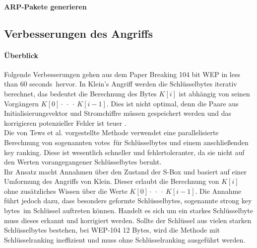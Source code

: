 \documentclass[10pt,a4paper]{article}
\begin{document}
\paragraph{ARP-Pakete generieren}

\subsection{Verbesserungen des Angriffs}
\paragraph{Überblick}
Folgende Verbesserungen gehen aus dem Paper \glqq Breaking 104 bit WEP in less than 60 seconds\grqq \cite{TWP07}\ hervor.
In Klein's Angriff werden die Schlüsselbytes iterativ berechnet, das bedeutet die Berechnung des Bytes $K[i]$ ist abhängig von seinen Vorgängern $K[0] \cdot\ \cdot\ \cdot\ K[i-1]$. Dies ist nicht optimal, denn die Paare aus Initialisierungsvektor und Stromchiffre müssen gespeichert werden und das korrigieren potenzieller Fehler ist teuer \cite[Kapitel 4]{TWP07}.\\ Die von Tews et al. vorgestellte Methode verwendet eine parallelisierte Berechnung von sogenannten \glqq votes\grqq\ für Schlüsselbytes und einem anschließenden \glqq key ranking\grqq. Diese ist wesentlich schneller und fehlertoleranter, da sie nicht auf den Werten vorangegangener Schlüsselbytes beruht.\\Ihr Ansatz macht Annahmen über den Zustand der S-Box und basiert auf einer Umformung des Angriffs von Klein. Dieser erlaubt die Berechnung von $K[i]$ ohne zusätzliches Wissen über die Werte $K[0] \cdot\ \cdot\ \cdot\ K[i-1]$. Die Annahme führt jedoch dazu, dass besonders geformte Schlüsselbytes, sogenannte \glqq strong key bytes\grqq\ im Schlüssel auftreten können. Handelt es sich um ein starkes Schlüsselbyte muss dieses erkannt und korrigiert werden. Sollte der Schlüssel aus vielen starken Schlüsselbytes bestehen, bei WEP-104 12 Bytes, wird die Methode mit Schlüsselranking ineffizient und muss ohne Schlüsselranking ausgeführt werden.
\end{document}
